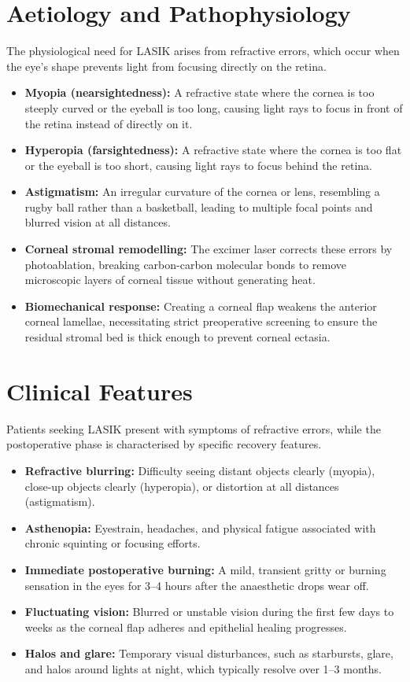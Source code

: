 \section*{Aetiology and Pathophysiology}
The physiological need for LASIK arises from refractive errors, which occur when the eye's shape prevents light from focusing directly on the retina.
\begin{itemize}
    \item \textbf{Myopia (nearsightedness):} A refractive state where the cornea is too steeply curved or the eyeball is too long, causing light rays to focus in front of the retina instead of directly on it.
    \item \textbf{Hyperopia (farsightedness):} A refractive state where the cornea is too flat or the eyeball is too short, causing light rays to focus behind the retina.
    \item \textbf{Astigmatism:} An irregular curvature of the cornea or lens, resembling a rugby ball rather than a basketball, leading to multiple focal points and blurred vision at all distances.
    \item \textbf{Corneal stromal remodelling:} The excimer laser corrects these errors by photoablation, breaking carbon-carbon molecular bonds to remove microscopic layers of corneal tissue without generating heat.
    \item \textbf{Biomechanical response:} Creating a corneal flap weakens the anterior corneal lamellae, necessitating strict preoperative screening to ensure the residual stromal bed is thick enough to prevent corneal ectasia.
\end{itemize}

\section*{Clinical Features}
Patients seeking LASIK present with symptoms of refractive errors, while the postoperative phase is characterised by specific recovery features.
\begin{itemize}
    \item \textbf{Refractive blurring:} Difficulty seeing distant objects clearly (myopia), close-up objects clearly (hyperopia), or distortion at all distances (astigmatism).
    \item \textbf{Asthenopia:} Eyestrain, headaches, and physical fatigue associated with chronic squinting or focusing efforts.
    \item \textbf{Immediate postoperative burning:} A mild, transient gritty or burning sensation in the eyes for 3--4 hours after the anaesthetic drops wear off.
    \item \textbf{Fluctuating vision:} Blurred or unstable vision during the first few days to weeks as the corneal flap adheres and epithelial healing progresses.
    \item \textbf{Halos and glare:} Temporary visual disturbances, such as starbursts, glare, and halos around lights at night, which typically resolve over 1--3 months.
\end{itemize}

